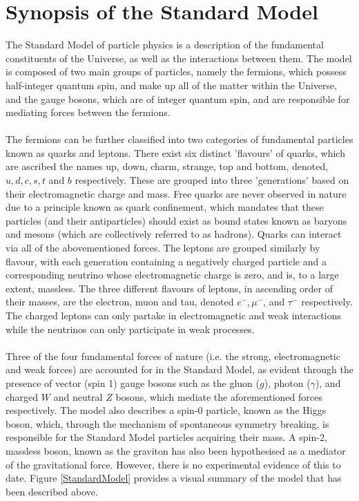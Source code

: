 \section{Synopsis of the Standard Model}
The Standard Model of particle physics is a description of the fundamental constituents of the Universe, as well as the interactions between them.
The model is composed of two main groups of particles, namely the fermions, which possess half-integer quantum spin, and make up all of the 
matter within the Universe, and the gauge bosons, which are of integer quantum spin, and are responsible for mediating forces between the fermions.\\
\\
The fermions can be further classified into two categories of fundamental particles known as quarks and leptons. There exist six distinct 'flavours' of quarks, which are
ascribed the names up, down, charm, strange, top and bottom, denoted, $u, d, c, s, t$ and $b$ respectively. These are grouped into three 'generations' based on their electromagnetic charge
and mass. Free quarks are never observed in nature due to a principle known as quark confinement, which mandates that these particles (and their antiparticles) should exist as bound states known as baryons and mesons
(which are collectively referred to as hadrons). Quarks can interact via all of the abovementioned forces. The leptons are grouped similarly by flavour, with each generation containing a negatively charged particle and a corresponding neutrino
whose electromagnetic charge is zero, and is, to a large extent, massless. The three different flavours of leptons, in ascending order of their masses, are the electron, muon and tau, denoted $e^{-}, \mu^{-}$, and $\tau^{-}$ respectively. The charged leptons
can only partake in electromagnetic and weak interactions while the neutrinos can only participate in weak processes.\\
\\
Three of the four fundamental forces of nature (i.e. the strong, electromagnetic and weak forces) are accounted for in the Standard Model, as evident through the presence of vector (spin 1) gauge bosons such as the gluon ($g$), photon ($\gamma$), and charged $W$ and neutral $Z$ bosons, 
which mediate the aforementioned forces respectively. The model also describes a spin-0 particle, known as the Higgs boson, which, through the mechanism of spontaneous symmetry breaking, is responsible for the Standard Model particles acquiring their mass. A spin-2, massless boson, known as the graviton
has also been hypothesised as a mediator of the gravitational force. However, there is no experimental evidence of this to date. Figure \ref{StandardModel} provides a visual summary of the model that has been described above.\\
